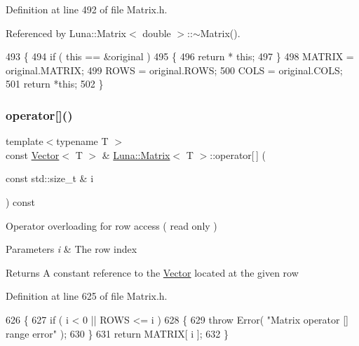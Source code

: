Definition at line 492 of file Matrix.\+h.



Referenced by Luna\+::\+Matrix$<$ double $>$\+::$\sim$\+Matrix().


\begin{DoxyCode}
493   \{
494     \textcolor{keywordflow}{if} ( \textcolor{keyword}{this} == &original )
495     \{
496       \textcolor{keywordflow}{return} * \textcolor{keyword}{this};
497     \}
498     MATRIX = original.MATRIX;
499     ROWS = original.ROWS;
500     COLS = original.COLS;
501     \textcolor{keywordflow}{return} *\textcolor{keyword}{this};
502   \}
\end{DoxyCode}
\mbox{\label{classLuna_1_1Matrix_a4ec4ab28a127aabe51181429a34a1d1b}} 
\subsubsection{\texorpdfstring{operator[]()}{operator[]()}\hspace{0.1cm}{\footnotesize\ttfamily [1/2]}}
{\footnotesize\ttfamily template$<$typename T $>$ \\
const \hyperlink{classLuna_1_1Vector}{Vector}$<$ T $>$ \& \hyperlink{classLuna_1_1Matrix}{Luna\+::\+Matrix}$<$ T $>$\+::operator\mbox{[}$\,$\mbox{]} (\begin{DoxyParamCaption}\item[{const std\+::size\+\_\+t \&}]{i }\end{DoxyParamCaption}) const\hspace{0.3cm}{\ttfamily [inline]}}



Operator overloading for row access ( read only ) 


\begin{DoxyParams}{Parameters}
{\em i} & The row index \\
\hline
\end{DoxyParams}
\begin{DoxyReturn}{Returns}
A constant reference to the \hyperlink{classLuna_1_1Vector}{Vector} located at the given row 
\end{DoxyReturn}


Definition at line 625 of file Matrix.\+h.


\begin{DoxyCode}
626   \{
627     \textcolor{keywordflow}{if} ( i < 0 || ROWS <= i )
628     \{
629       \textcolor{keywordflow}{throw} Error( \textcolor{stringliteral}{"Matrix operator [] range error"} );
630     \}
631     \textcolor{keywordflow}{return} MATRIX[ i ];
632   \}
\end{DoxyCode}
\mbox{\label{classLuna_1_1Matrix_a3e6bad71721d5a1e5a458ab77bcc18c7}} 
